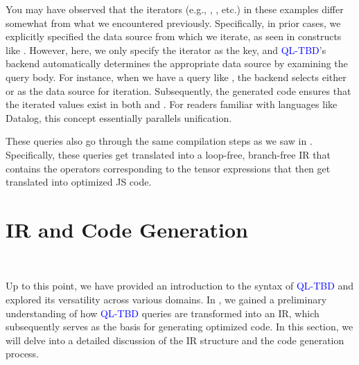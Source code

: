 \documentclass[runningheads]{llncs}
\newcommand{\lang}{\textcolor{blue}{QL-TBD}}
\begin{document}
You may have observed that the iterators (e.g., \inline{*}, , etc.) in these
examples differ somewhat from what we encountered previously.
Specifically, in prior cases, we explicitly specified the data source from which we iterate,
as seen in constructs like .
However, here, we only specify the iterator as the key, and \lang{}'s backend
automatically determines the appropriate data source by examining the query body.
For instance, when we have a query like , the
backend selects either  or  as the data source for iteration.
Subsequently, the generated code ensures that the iterated values exist in
both  and .
For readers familiar with languages like Datalog, this concept essentially
parallels unification.


These queries also go through the same compilation steps as we saw in .
Specifically, these queries get translated into a loop-free, branch-free IR that contains the
operators corresponding to the tensor expressions that then get translated into
optimized JS code.

\section{IR and Code Generation}~\label{sec:ir_codegen}

Up to this point, we have provided an introduction to the syntax of
\lang{} and explored its versatility across various domains.
In , we gained a preliminary understanding
of how \lang{} queries are transformed into an IR, which subsequently serves
as the basis for generating optimized code.
In this section, we will delve into a detailed discussion of the IR structure
and the code generation process.
\end{document}
